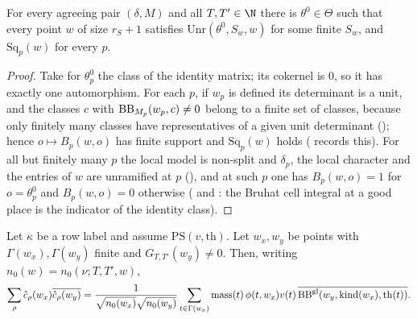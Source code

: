 \begin{lemma}\label{pf:thmS-leaves:lem:topunram}
For every agreeing pair $(\delta,M)$ and all $T,T'\in\N$ there is $\theta^0\in\Theta$ such that every point $w$ of size
$r_S+1$ satisfies $\mathrm{Unr}(\theta^0,S_w,w)$ for some finite $S_w$, and $\mathrm{Sq}_p(w)$ for every $p$.
\end{lemma}

\begin{proof}
Take for $\theta^0_p$ the class of the identity matrix; its cokernel is $0$, so it has exactly one automorphism. For each
$p$, if $w_p$ is defined its determinant is a unit, and the classes $c$ with $\mathrm{BB}_{M_p}(w_p,c)\ne0$ belong to a
finite set of classes, because only finitely many classes have representatives of a given unit determinant
(); hence $o\mapsto B_p(w,o)$ has finite support and
$\mathrm{Sq}_p(w)$ holds ( records this). For all but finitely many $p$ the
local model is non-split and $\delta_p$, the local character and the entries of $w$ are unramified at $p$
(), and at such $p$ one has $B_p(w,o)=1$ for $o=\theta^0_p$ and
$B_p(w,o)=0$ otherwise ( and : the
Bruhat cell integral at a good place is the indicator of the identity class).
\end{proof}

\begin{lemma}\label{pf:thmS-leaves:lem:rowspair}
Let $\kappa$ be a row label and assume $\mathrm{PS}(v,\mathrm{th})$. Let $w_x,w_y$ be points with $\Gamma(w_x),\Gamma(w_y)$
finite and $G_{T,T'}(w_y)\ne0$. Then, writing $n_0(w)=n_0(\nu;T,T',w)$,
\[
\sum_\rho\hat c_\rho(w_x)\overline{\hat c_\rho(w_y)}=\frac{1}{\sqrt{n_0(w_x)}\sqrt{n_0(w_y)}}\sum_{t\in\Gamma(w_x)}
\mathrm{mass}(t)\,\phi(t,w_x)v(t)\,\overline{\mathrm{BB}^{\mathrm{gl}}(w_y,\mathrm{kind}(w_x),\mathrm{th}(t))}.
\]
\end{lemma}

